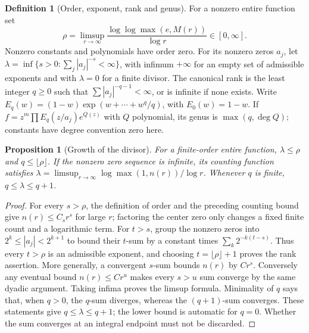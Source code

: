 \documentclass[11pt,a4paper,openany]{book}
\newtheorem{proposition}[theorem]{Proposition}
\theoremstyle{definition}
\newtheorem{definition}[theorem]{Definition}
\theoremstyle{remark}\newtheorem{remark}[theorem]{Remark}
\newcommand{\family}[1]{}
\begin{document}
\begin{definition}[Order, exponent, rank and genus]\label{d12:17-04}\family{D12.17.04}
For a nonzero entire function set
\[
 \rho=\limsup_{r\to\infty}
       \frac{\log\log\max(e,M(r))}{\log r}\in[0,\infty].
\]
Nonzero constants and polynomials have order zero. For its nonzero
zeros $a_j$, let
$\lambda=\inf\{s>0:\sum_j|a_j|^{-s}<\infty\}$, with infimum
$+\infty$ for an empty set of admissible exponents and with $\lambda=0$
for a finite divisor. The canonical rank is the least integer $q\ge0$
such that $\sum|a_j|^{-q-1}<\infty$, or is infinite if none exists.
Write $E_q(w)=(1-w)\exp(w+\cdots+w^q/q)$, with $E_0(w)=1-w$.
If $f=z^m\prod E_q(z/a_j)e^{Q(z)}$ with $Q$ polynomial, its genus is
$\max(q,\deg Q)$; constants have degree convention zero here.
\end{definition}

\begin{proposition}[Growth of the divisor]\label{d12:17:exponent}
For a finite-order entire function, $\lambda\le\rho$ and
$q\le\lfloor\rho\rfloor$. If the nonzero zero sequence is infinite,
its counting function satisfies
$\lambda=\limsup_{r\to\infty}\log\max(1,n(r))/\log r$.
Whenever $q$ is finite, $q\le\lambda\le q+1$.
\end{proposition}
\begin{proof}
For every $s>\rho$, the definition of order and the preceding counting
bound give $n(r)\le C_s r^s$ for large $r$; factoring the center zero
only changes a fixed finite count and a logarithmic term. For $t>s$,
group the nonzero zeros into $2^k\le|a_j|<2^{k+1}$ to bound their
$t$-sum by a constant times $\sum_k2^{-k(t-s)}$. Thus every $t>\rho$
is an admissible exponent, and choosing $t=\lfloor\rho\rfloor+1$
proves the rank assertion. More generally, a convergent $s$-sum bounds
$n(r)$ by $Cr^s$. Conversely any eventual bound $n(r)\le Cr^u$ makes
every $s>u$ sum converge by the same dyadic argument. Taking infima
proves the limsup formula. Minimality of $q$ says that, when $q>0$,
the $q$-sum diverges, whereas the $(q+1)$-sum converges. These statements
give $q\le\lambda\le q+1$; the lower bound is automatic for $q=0$.
Whether the sum converges at an integral endpoint must not be discarded.
\end{proof}
\end{document}
